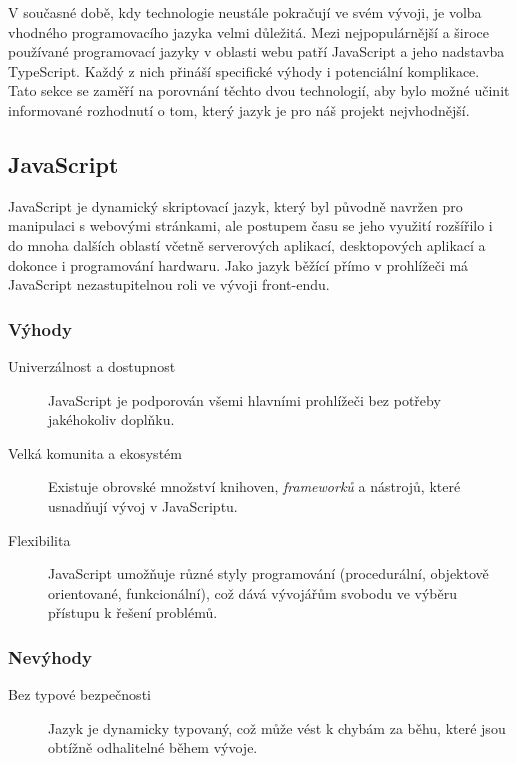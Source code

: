 V současné době, kdy technologie neustále pokračují ve svém vývoji, je volba vhodného programovacího jazyka velmi důležitá. Mezi nejpopulárnější a široce používané programovací jazyky v oblasti webu patří JavaScript a jeho nadstavba TypeScript. Každý z nich přináší specifické výhody i potenciální komplikace. Tato sekce se zaměří na porovnání těchto dvou technologií, aby bylo možné učinit informované rozhodnutí o tom, který jazyk je pro náš projekt nejvhodnější.

\subsection{JavaScript}
JavaScript je dynamický skriptovací jazyk, který byl původně navržen pro manipulaci s webovými stránkami, ale postupem času se jeho využití rozšířilo i do mnoha dalších oblastí včetně serverových aplikací, desktopových aplikací a dokonce i programování hardwaru. Jako jazyk běžící přímo v prohlížeči má JavaScript nezastupitelnou roli ve vývoji front-endu. \cite{JavaScript}

\subsubsection{Výhody}

\begin{description}
    \item[Univerzálnost a dostupnost] JavaScript je podporován všemi hlavními prohlížeči bez potřeby jakéhokoliv doplňku.
    \item[Velká komunita a ekosystém] Existuje obrovské množství knihoven, \emph{frameworků} a nástrojů, které usnadňují vývoj v JavaScriptu.
    \item[Flexibilita] JavaScript umožňuje různé styly programování (procedurální, objektově orientované, funkcionální), což dává vývojářům svobodu ve výběru přístupu k řešení problémů.
\end{description}

\subsubsection{Nevýhody}

\begin{description}
    \item[Bez typové bezpečnosti] Jazyk je dynamicky typovaný, což může vést k chybám za běhu, které jsou obtížně odhalitelné během vývoje.
\end{description}

